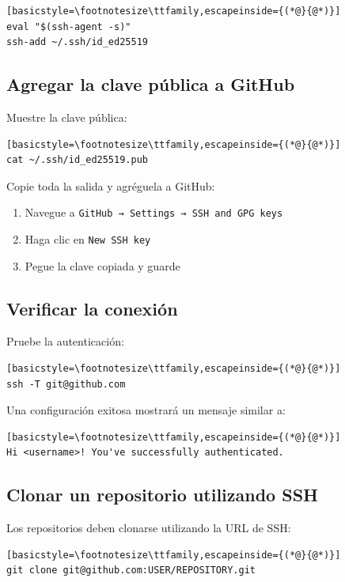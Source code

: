 \begin{lstlisting}[basicstyle=\footnotesize\ttfamily,escapeinside={(*@}{@*)}]
eval "$(ssh-agent -s)"
ssh-add ~/.ssh/id_ed25519
\end{lstlisting}

\subsection{Agregar la clave pública a GitHub}

Muestre la clave pública:

\begin{lstlisting}[basicstyle=\footnotesize\ttfamily,escapeinside={(*@}{@*)}]
cat ~/.ssh/id_ed25519.pub
\end{lstlisting}

Copie toda la salida y agréguela a GitHub:

\begin{enumerate}
\item Navegue a \texttt{GitHub → Settings → SSH and GPG keys}
\item Haga clic en \texttt{New SSH key}
\item Pegue la clave copiada y guarde
\end{enumerate}

\subsection{Verificar la conexión}

Pruebe la autenticación:

\begin{lstlisting}[basicstyle=\footnotesize\ttfamily,escapeinside={(*@}{@*)}]
ssh -T git@github.com
\end{lstlisting}

Una configuración exitosa mostrará un mensaje similar a:

\begin{lstlisting}[basicstyle=\footnotesize\ttfamily,escapeinside={(*@}{@*)}]
Hi <username>! You've successfully authenticated.
\end{lstlisting}

\subsection{Clonar un repositorio utilizando SSH}

Los repositorios deben clonarse utilizando la URL de SSH:

\begin{lstlisting}[basicstyle=\footnotesize\ttfamily,escapeinside={(*@}{@*)}]
git clone git@github.com:USER/REPOSITORY.git
\end{lstlisting}

